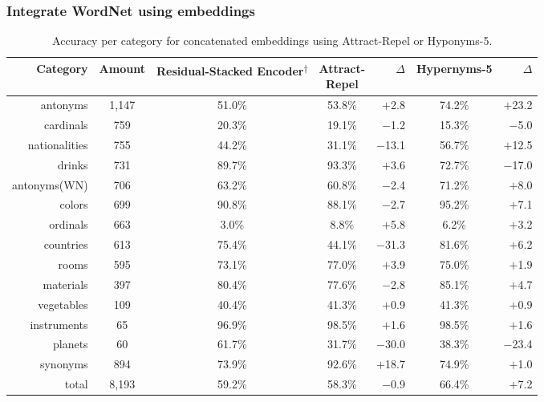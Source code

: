 \subsubsection{Integrate WordNet using embeddings}
\begin{table}[tph!]
\centering
\begin{tabular}{rcc|cr|cr}
\textbf{Category}  & \textbf{Amount}& \specialcellc{\textbf{Residual-Stacked}\\\textbf{Encoder}\textsuperscript{$\dagger$}} & \specialcellc{\textbf{Attract-}\\\textbf{Repel}} & $\Delta$ &  \textbf{Hypernyms-5} & $\Delta$ \\
\toprule
antonyms & 1,147 & 51.0\% & 53.8\% & $+$2.8 & 74.2\% & $+$23.2 \\
cardinals & 759 & 20.3\% & 19.1\% & $-$1.2 & 15.3\% & $-$5.0 \\
nationalities & 755 & 44.2\% & 31.1\% & $-$13.1 & 56.7\% & $+$12.5 \\
drinks & 731 & 89.7\% & 93.3\% & $+$3.6 & 72.7\% & $-$17.0 \\
antonyms(WN) & 706 & 63.2\% & 60.8\% & $-$2.4 & 71.2\% & $+$8.0 \\
colors & 699 & 90.8\% & 88.1\% & $-$2.7 & 95.2\% & $+$7.1 \\
ordinals & 663 & 3.0\% & 8.8\% & $+$5.8 & 6.2\% & $+$3.2 \\
countries & 613 & 75.4\% & 44.1\% & $-$31.3 & 81.6\% & $+$6.2 \\
rooms & 595 & 73.1\% & 77.0\% & $+$3.9 & 75.0\% & $+$1.9\\
materials & 397 & 80.4\% & 77.6\% & $-$2.8 & 85.1\% & $+$4.7 \\
vegetables & 109 & 40.4\% & 41.3\% & $+$0.9 & 41.3\% & $+$0.9 \\
instruments & 65 & 96.9\% & 98.5\% & $+$1.6 & 98.5\% & $+$1.6 \\
planets & 60 & 61.7\% & 31.7\% & $-$30.0 & 38.3\% & $-$23.4 \\
\midrule
synonyms & 894 & 73.9\% & 92.6\% & $+$18.7 & 74.9\% & $+$1.0 \\
\midrule
total & 8,193 & 59.2\% & 58.3\% & $-$0.9 & 66.4\% & $+$7.2 \\
\bottomrule
\end{tabular}
\caption{Accuracy per category for concatenated embeddings using Attract-Repel or Hyponyms-5.}
\label{tab:detail_added_embds}
\end{table}
